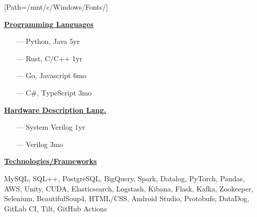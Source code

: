 \documentclass{WeiAndrew}
\def\defaultsectionspacingsize{11px}
\begin{document}
[Path=/mnt/c/Windows/Fonts/]
\setlength{\topskip}{0pt}
\noindent{}%
{%
    \hspace{0.02\textwidth}
    \begin{minipage}[t][\textheight-2\fboxsep-2\fboxrule][c]{0.25\textwidth}
        \color{white}
        \vspace{\defaultsectionspacingsize}

        \begin{itemize}[align=center, leftmargin=7.5mm]
        \end{itemize}
        \vspace{\defaultsectionspacingsize}

        \textbf{\underline{Programming Languages}}
        \begin{itemize}[leftmargin=4mm, rightmargin=20px]
            \item[---] Python, Java    \hfill 5yr
            \item[---] Rust, C/C++     \hfill 1yr
            \item[---] Go, Javascript  \hfill 6mo
            \item[---] C\#, TypeScript \hfill 3mo
        \end{itemize}
        \vspace{\defaultsectionspacingsize}

        \noindent\textbf{\underline{Hardware Description Lang.}}
        \begin{itemize}[leftmargin=4mm, rightmargin=20px]
            \item[---] System Verilog \hfill 1yr
            \item[---] Verilog        \hfill 3mo
        \end{itemize}
        \vspace{\defaultsectionspacingsize}

        \textbf{\underline{Technologies/Frameworks}}
        \raggedright MySQL, SQL++, PostgreSQL, BigQuery,
        Spark, Datalog, PyTorch,
        Pandas, AWS, Unity, CUDA,
        Elasticsearch, Logstash,
        Kibana, Flask, Kafka,
        Zookeeper, Selenium,
        BeautifulSoup4, HTML/CSS,
        Android Studio, Protobufs,
        DataDog, GitLab CI, Tilt, GitHub Actions
        \vspace{\defaultsectionspacingsize}


\end{minipage}}
\end{document}
